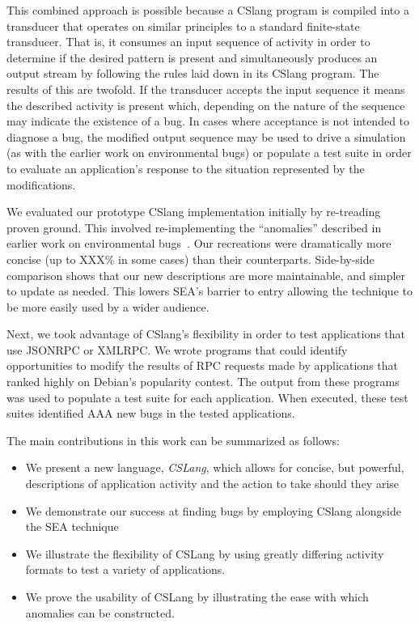 This combined approach is possible because a CSlang program is
compiled into a transducer that
operates on similar principles to a standard finite-state transducer.
That is, it consumes an input sequence of activity
in order to determine if the desired pattern is present
and simultaneously produces an output stream by
following the rules laid down in its CSlang program.
The results of this are twofold.  If the transducer accepts the input sequence
it means the described activity is present which, depending on the nature of
the sequence may indicate the existence of a bug.  In cases where acceptance
is not intended to diagnose a bug, the modified output sequence may be used
to drive a simulation (as with the earlier work on environmental bugs) or populate
a test suite in order to evaluate an application's response
to the situation represented by the modifications.

We evaluated our prototype CSlang implementation initially by 
re-treading proven ground.
This involved re-implementing the ``anomalies''  
described in earlier work on environmental bugs~\cite{crashsim}.
Our recreations were dramatically more concise (up to XXX\% in some cases)
than their counterparts.  Side-by-side comparison shows that our new
descriptions are
more maintainable,
and simpler to update as needed.
This lowers SEA's barrier to entry allowing the
technique to be more easily used by a wider audience.

Next, we took advantage of CSlang's flexibility in order to test
applications that use JSONRPC or XMLRPC.
We wrote programs that could identify opportunities to modify the results of RPC
requests made by applications that ranked highly on Debian's popularity contest.
The output from these programs was used to populate a test suite
for each application.
When executed, these test suites identified AAA new bugs in the tested applications.

The main contributions in this work can be summarized as follows:

\begin{itemize}

\item{We present a new language, {\em CSLang},
  which allows for concise, but powerful, descriptions of
    application activity and the action to take should they arise}

\item{We demonstrate our success at finding bugs by employing CSlang
  alongside the SEA technique}

\item{We illustrate the flexibility of CSLang by using greatly differing activity
formats to test a variety of applications. }

\item{We prove the usability of CSLang by illustrating the ease with which
  anomalies can be constructed.}

\end{itemize}

